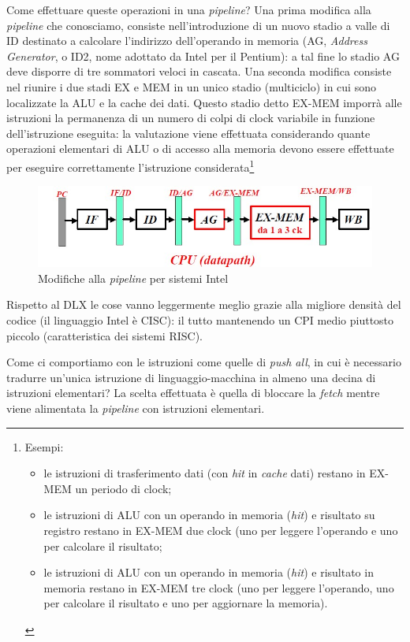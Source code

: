 Come effettuare queste operazioni in una \textit{pipeline}? Una prima modifica alla \textit{pipeline} che conosciamo, consiste nell'introduzione di un nuovo stadio a valle di ID destinato a calcolare l'indirizzo dell'operando in memoria (AG,\textit{ Address Generator}, o ID2, nome adottato da Intel per il Pentium): a tal fine lo stadio AG deve disporre di tre sommatori veloci in cascata.
Una seconda modifica consiste nel riunire i due stadi EX e MEM in un unico stadio (multiciclo) in cui sono localizzate la ALU e la cache dei dati. Questo stadio detto EX-MEM imporrà alle istruzioni la permanenza di un numero di colpi di clock variabile in funzione dell'istruzione eseguita: la valutazione viene effettuata considerando quante operazioni elementari di ALU o di accesso alla memoria devono essere effettuate per eseguire correttamente l'istruzione considerata\footnote{Esempi:
\begin{itemize}
\item  le istruzioni di trasferimento dati (con \textit{hit} in \textit{cache} dati) restano in EX-MEM un
periodo di clock;
\item  le istruzioni di ALU con un operando in memoria (\textit{hit}) e risultato su registro restano in
EX-MEM due clock (uno per leggere l'operando e uno per calcolare il risultato;
\item le istruzioni di ALU con un operando in memoria (\textit{hit}) e risultato in memoria restano
in EX-MEM tre clock (uno per leggere l'operando, uno per calcolare il risultato e uno
per aggiornare la memoria).
\end{itemize}
}

\begin{figure}[!h]
\centering
\includegraphics[width=0.8\columnwidth]{img/intelDataPath}
\caption{Modifiche alla \textit{pipeline} per sistemi Intel}
\label{fig:intelDataPath}
\end{figure}

Rispetto al DLX le cose vanno leggermente meglio grazie alla migliore densità del codice (il linguaggio Intel è CISC): il tutto mantenendo un CPI medio piuttosto piccolo (caratteristica dei sistemi RISC).


Come ci comportiamo con le istruzioni come quelle di \textit{push all}, in cui è necessario tradurre un'unica istruzione di linguaggio-macchina in almeno una decina di istruzioni elementari? La scelta effettuata è quella di bloccare la \textit{fetch} mentre viene alimentata la \textit{pipeline} con istruzioni elementari.

